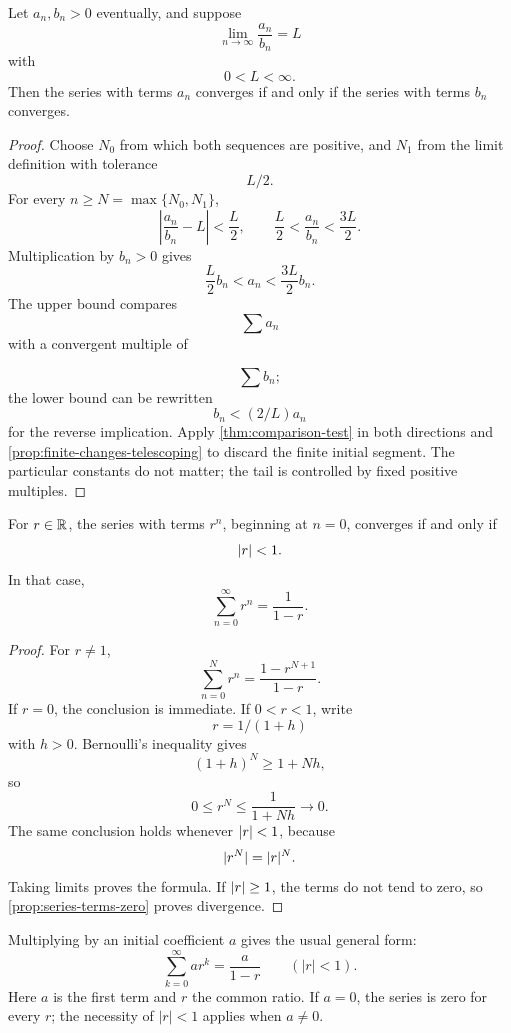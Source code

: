 \begin{theorem}
\label{thm:limit-comparison}
Let $a_n,b_n>0$ eventually, and suppose
\[
\lim_{n\to\infty}\frac{a_n}{b_n}=L
\]
with
\[
0<L<\infty.
\]
Then the series with terms $a_n$ converges if and only if the series with terms $b_n$ converges.
\end{theorem}
\begin{proof}
Choose $N_0$ from which both sequences are positive, and $N_1$ from
the limit definition with tolerance
\[
L/2.
\]
 For every
$n\geq N=\max\{N_0,N_1\}$,
\[
\left|\frac{a_n}{b_n}-L\right|<\frac L2,
\qquad \frac L2<\frac{a_n}{b_n}<\frac{3L}{2}.
\]
Multiplication by $b_n>0$ gives
\[
\frac L2b_n<a_n<\frac{3L}{2}b_n.
\]
The upper bound compares
\[
\sum a_n
\]
 with a convergent multiple of

\[
\sum b_n;
\]
 the lower bound can be rewritten
\[
b_n<(2/L)a_n
\]
 for
the reverse implication. Apply \cref{thm:comparison-test} in both
directions and \cref{prop:finite-changes-telescoping} to discard the
finite initial segment. The particular constants do not matter; the tail
is controlled by fixed positive multiples.
\end{proof}

\begin{theorem}
\label{thm:geometric-series}
For $r\in\mathbb{R}$, the series with terms $r^n$, beginning at $n=0$, converges if and only if
\[
\lvert r\rvert<1.
\]
In that case,
\[
\sum_{n=0}^{\infty}r^n=\frac{1}{1-r}.
\]
\end{theorem}
\begin{proof}
For $r\ne1$,
\[
\sum_{n=0}^{N}r^n=\frac{1-r^{N+1}}{1-r}.
\]
If $r=0$, the conclusion is immediate. If $0<r<1$, write
\[
r=1/(1+h)
\]
 with $h>0$. Bernoulli's inequality gives
\[
(1+h)^N\geq1+Nh,
\]
so
\[
0\leq r^N\leq\frac{1}{1+Nh}\longrightarrow0.
\]
The same conclusion holds whenever $\lvert r\rvert<1$, because
\[
\lvert r^N\rvert=\lvert r\rvert^N.
\]
Taking limits proves the formula. If $\lvert r\rvert\geq1$, the terms do not tend to zero, so \cref{prop:series-terms-zero} proves divergence.
\end{proof}

Multiplying by an initial coefficient $a$ gives the usual general form:
\[
\sum_{k=0}^{\infty}ar^k=\frac{a}{1-r}\qquad(|r|<1).
\]
Here $a$ is the first term and $r$ the common ratio. If $a=0$, the series
is zero for every $r$; the necessity of $|r|<1$ applies when $a\ne0$.


